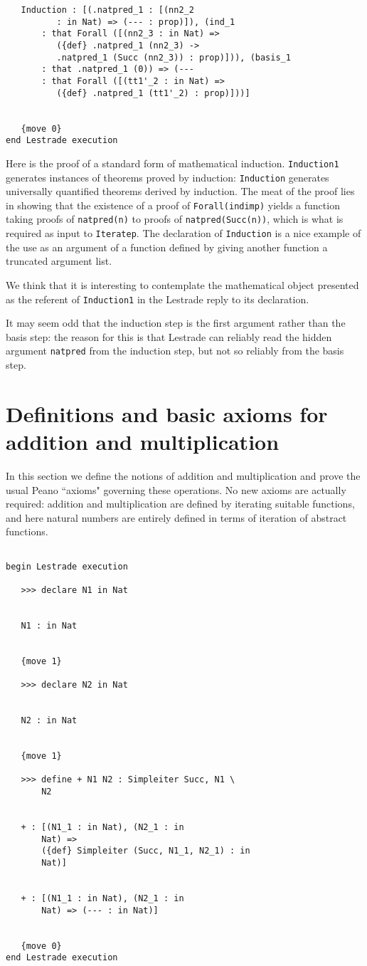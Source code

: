 \documentclass[12pt]{article}
\begin{document}
\begin{verbatim}
   Induction : [(.natpred_1 : [(nn2_2 
          : in Nat) => (--- : prop)]), (ind_1 
       : that Forall ([(nn2_3 : in Nat) => 
          ({def} .natpred_1 (nn2_3) -> 
          .natpred_1 (Succ (nn2_3)) : prop)])), (basis_1 
       : that .natpred_1 (0)) => (--- 
       : that Forall ([(tt1'_2 : in Nat) => 
          ({def} .natpred_1 (tt1'_2) : prop)]))]


   {move 0}
end Lestrade execution
\end{verbatim}

Here is the proof of a standard form of mathematical induction.   {\tt Induction1} generates instances of theorems proved by induction:  {\tt Induction} generates universally quantified theorems derived by induction.  The meat of the proof lies in showing that the existence of a proof of {\tt Forall(indimp)} yields a function taking proofs of {\tt natpred(n)} to proofs of {\tt natpred(Succ(n))}, which is what is required as input to {\tt Iteratep}.  The declaration of {\tt Induction} is a nice example of the use as an argument of a function defined by giving another function a truncated argument list.

We think that it is interesting to contemplate the mathematical object presented as the referent of {\tt Induction1} in the Lestrade reply to its declaration.

It may seem odd that the induction step is the first argument rather than the basis step:  the reason for this is that Lestrade can reliably read the hidden argument {\tt natpred} from the induction step, but not so reliably from the basis step.

\section{Definitions and basic axioms for addition and multiplication}

In this section we define the notions of addition and multiplication and prove the usual Peano ``axioms" governing these operations.  No new axioms are actually required:  addition and multiplication are defined by iterating suitable functions,
and here natural numbers are entirely defined in terms of iteration of abstract functions.

\begin{verbatim}

begin Lestrade execution

   >>> declare N1 in Nat


   N1 : in Nat


   {move 1}

   >>> declare N2 in Nat


   N2 : in Nat


   {move 1}

   >>> define + N1 N2 : Simpleiter Succ, N1 \
       N2


   + : [(N1_1 : in Nat), (N2_1 : in 
       Nat) => 
       ({def} Simpleiter (Succ, N1_1, N2_1) : in 
       Nat)]


   + : [(N1_1 : in Nat), (N2_1 : in 
       Nat) => (--- : in Nat)]


   {move 0}
end Lestrade execution
\end{verbatim}
\end{document}
